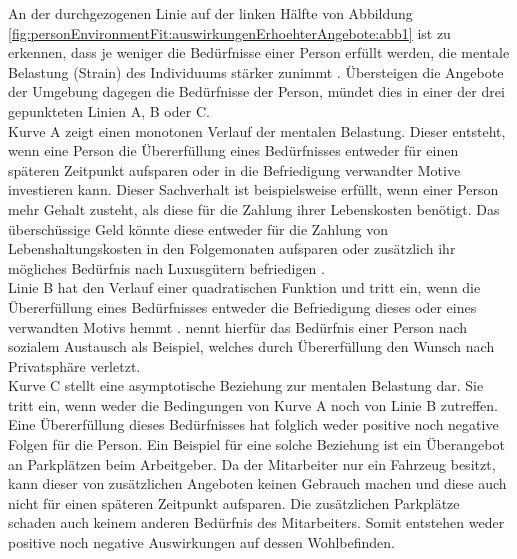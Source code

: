 An der durchgezogenen Linie auf der linken Hälfte von Abbildung \ref{fig:personEnvironmentFit:auswirkungenErhoehterAngebote:abb1} ist zu erkennen, dass je weniger die Bedürfnisse einer Person erfüllt werden, die mentale Belastung (Strain) des Individuums stärker zunimmt \cite{mechanismsOfJobStressAndStrain:1982}. Übersteigen die Angebote der Umgebung dagegen die Bedürfnisse der Person, mündet dies in einer der drei gepunkteten Linien A, B oder C.\\
Kurve A zeigt einen monotonen Verlauf der mentalen Belastung. Dieser entsteht, wenn eine Person die Übererfüllung eines Bedürfnisses entweder für einen späteren Zeitpunkt aufsparen oder in die Befriedigung verwandter Motive investieren kann. Dieser Sachverhalt ist beispielsweise erfüllt, wenn einer Person mehr Gehalt zusteht, als diese für die Zahlung ihrer Lebenskosten benötigt. Das überschüssige Geld könnte diese entweder für die Zahlung von Lebenshaltungskosten in den Folgemonaten aufsparen oder zusätzlich ihr mögliches Bedürfnis nach Luxusgütern befriedigen \cite[S. 21]{edwards:2008}.\\
Linie B hat den Verlauf einer quadratischen Funktion und tritt ein, wenn die Übererfüllung eines Bedürfnisses entweder die Befriedigung dieses oder eines verwandten Motivs hemmt \cite[S. 5]{caplan:1987}. \textcite{harrison:1978} nennt hierfür das Bedürfnis einer Person nach sozialem Austausch als Beispiel, welches durch Übererfüllung den Wunsch nach Privatsphäre verletzt.\\
Kurve C stellt eine asymptotische Beziehung zur mentalen Belastung dar. Sie tritt ein, wenn weder die Bedingungen von Kurve A noch von Linie B zutreffen. Eine Übererfüllung dieses Bedürfnisses hat folglich weder positive noch negative Folgen für die Person. Ein Beispiel für eine solche Beziehung ist ein Überangebot an Parkplätzen beim Arbeitgeber. Da der Mitarbeiter nur ein Fahrzeug besitzt, kann dieser von zusätzlichen Angeboten keinen Gebrauch machen und diese auch nicht für einen späteren Zeitpunkt aufsparen. Die zusätzlichen Parkplätze schaden auch keinem anderen Bedürfnis des Mitarbeiters. Somit entstehen weder positive noch negative Auswirkungen auf dessen Wohlbefinden.\\
